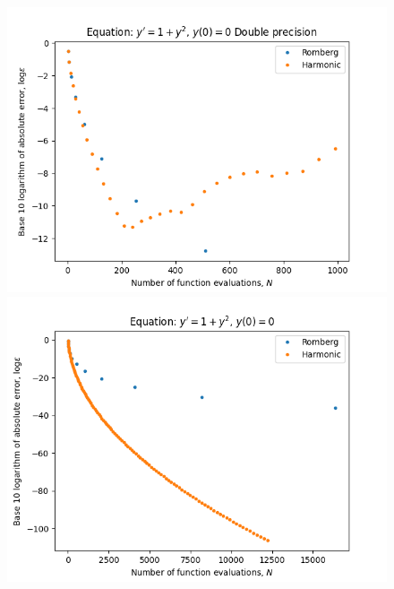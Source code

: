 \begin{figure}[H]
\centering
\begin{minipage}{0.45\textwidth}
\centering
\includegraphics[scale=0.45]{../results/emr_plots/tangens.png}
\end{minipage}
\begin{minipage}{0.45\textwidth}
\centering
\includegraphics[scale=0.45]{../results/emr_plots/tangens_hp.png}
\end{minipage}
\end{figure}


